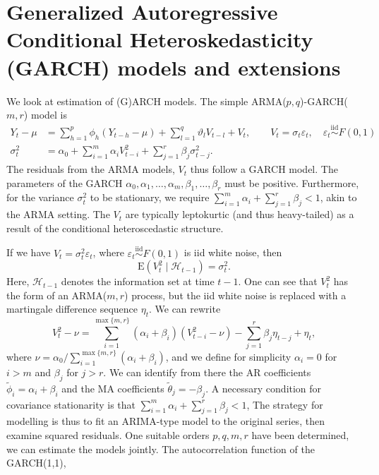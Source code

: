 \documentclass[]{book}
\begin{document}
\section{Generalized Autoregressive Conditional Heteroskedasticity
(GARCH) models and
extensions}\label{generalized-autoregressive-conditional-heteroskedasticity-garch-models-and-extensions}

We look at estimation of (G)ARCH models. The simple
ARMA(\(p, q\))-GARCH(\(m, r\)) model is \[
\begin{align*}
Y_t -\mu &=   \sum_{h = 1}^p \phi_h (Y_{t-h}-\mu)+ \sum_{l = 1}^q \vartheta_lV_{t-l}+ V_t, \qquad V_t = \sigma_t\varepsilon_t, \quad\varepsilon_t\stackrel{\mathrm{iid}}{\sim} F(0, 1) \\ \sigma^2_t &= \alpha_0+\sum_{i = 1}^m \alpha_iV_{t-i}^2 + \sum_{j = 1}^r \beta_j\sigma^2_{t-j}. 
\end{align*}
\] The residuals from the ARMA models, \(V_t\) thus follow a GARCH
model. The parameters of the GARCH
\(\alpha_0, \alpha_1, \ldots, \alpha_m, \beta_1, \ldots, \beta_r\) must
be positive. Furthermore, for the variance \(\sigma^2_t\) to be
stationary, we require
\(\sum_{i=1}^m \alpha_i + \sum_{j=1}^r \beta_j <1\), akin to the ARMA
setting. The \(V_t\) are typically leptokurtic (and thus heavy-tailed)
as a result of the conditional heteroscedastic structure.

If we have \(V_t=\sigma_t^2\varepsilon_t\), where
\(\varepsilon_t \stackrel{\mathrm{iid}}{\sim}F(0, 1)\) is iid white
noise, then \[\mathrm{E}(V_t^2 \mid \mathcal{H}_{t-1}) = \sigma^2_t.\]
Here, \(\mathcal{H}_{t-1}\) denotes the information set at time \(t-1\).
One can see that \(V_t^2\) has the form of an ARMA(\(m, r\)) process,
but the iid white noise is replaced with a martingale difference
sequence \(\eta_t\). We can rewrite
\[V_t^2 -\nu = \sum_{i=1}^{\max\{m, r\}} (\alpha_i+\beta_i)(V_{t-i}^2-\nu) - \sum_{j=1}^r \beta_j \eta_{t-j} + \eta_t,\]
where \(\nu = \alpha_0/ \sum_{i=1}^{\max\{m, r\}}(\alpha_i+\beta_i)\),
and we define for simplicity \(\alpha_i=0\) for \(i>m\) and \(\beta_j\)
for \(j>r\). We can identify from there the AR coefficients
\(\tilde{\phi}_i=\alpha_i+\beta_i\) and the MA coefficients
\(\tilde{\theta}_j=-\beta_j\). A necessary condition for covariance
stationarity is that
\(\sum_{i=1}^m \alpha_i + \sum_{j=1}^r \beta_j <1\), The strategy for
modelling is thus to fit an ARIMA-type model to the original series,
then examine squared residuals. One suitable orders \(p, q, m, r\) have
been determined, we can estimate the models jointly. The autocorrelation
function of the GARCH(1,1),
\end{document}
